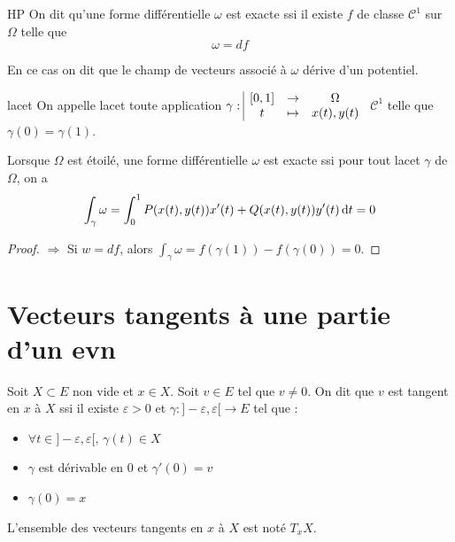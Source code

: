 \begin{definition}{HP}{}
    On dit qu'une forme différentielle $\omega$ est exacte ssi 
    il existe $f$ de classe $\mathscr C^1$ sur $\Omega$ telle que
    $$\omega = df$$

    En ce cas on dit que le champ de vecteurs associé à $\omega$ dérive d'un potentiel.
\end{definition}

\begin{definition}{lacet}{}
    On appelle lacet toute application $\gamma: \space \begin{array}{|ccc} \displaystyle [0, 1] & \to & \displaystyle \Omega \\ \displaystyle t & \mapsto & \displaystyle x(t), y(t) \end{array}$ $\mathscr C^1$ 
    telle que $\gamma(0) = \gamma(1)$.
\end{definition}

\begin{theoreme}{}{}
    Lorsque $\Omega$ est étoilé, une forme différentielle $\omega$ est exacte ssi 
    pour tout lacet $\gamma$ de $\Omega$, on a
    $$\int_\gamma \omega = \int_0^1 P(x(t), y(t)) x'(t) + Q(x(t), y(t)) y'(t) \,\mathrm{d}t = 0$$
\end{theoreme}

\begin{proof}
    $\Rightarrow$ Si $w = df$, alors $\int_\gamma \omega = f(\gamma(1)) - f(\gamma(0)) = 0$.
\end{proof}


\section{Vecteurs tangents à une partie d'un evn}



\begin{definition}{}{}
    Soit $X \subset E$ non vide et $x \in X$. Soit $v \in E$ tel que 
    $v \neq 0$. On dit que $v$ est tangent en $x$ à $X$ ssi il existe $\varepsilon > 0$ 
    et $\gamma : ]- \varepsilon, \varepsilon[ \to E$ tel que : 
    \begin{itemize}
        \item $\forall t \in ]- \varepsilon, \varepsilon[, \, \gamma(t) \in X$
        \item $\gamma$ est dérivable en $0$ et $\gamma'(0) = v$
        \item $\gamma(0) = x$
    \end{itemize}

    L'ensemble des vecteurs tangents en $x$ à $X$ est noté $T_xX$. 
\end{definition}

